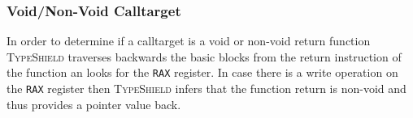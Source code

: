 \subsubsection{Void/Non-Void Calltarget}
In order to determine if a calltarget is a void or non-void return function
\textsc{TypeShield} traverses backwards the basic blocks from the return instruction of the function an looks for the \texttt{RAX} register.
In case  there is a write operation on the \texttt{RAX} register then \textsc{TypeShield}
infers that the function return is non-void and thus provides a pointer value back.

% 
